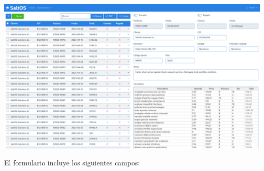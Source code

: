 \documentclass[a4paper]{article}
\begin{document}
\begin{center}\includegraphics[width=1\textwidth]{../ujest/snaps/test-screenshots-js-screenshots-sales-invoices-edit-100-es-es-1-snap.png}\end{center}

El formulario incluye los siguientes campos:
\end{document}
